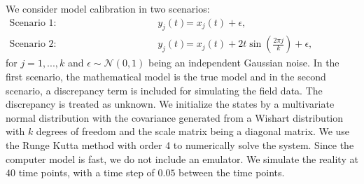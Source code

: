 We consider  model calibration in two scenarios:  
 \begin{align}
 \mbox{Scenario 1: } \quad \quad \quad \quad \quad \quad \quad \quad \quad \quad  y_j(t)&= x_j(t) +\epsilon,    \quad \quad \quad \quad \quad \quad \quad   \quad \quad \quad \quad \quad  \label{equ:no_discrepancy}\\ 
\mbox{Scenario 2: } \quad \quad \quad \quad \quad \quad \quad \quad \quad \quad y_j(t)&= x_j(t) +2t \sin\left(\frac{2\pi j}{k}\right)+ \epsilon,   \quad \quad \quad \quad \quad \quad \quad \quad \quad \quad \quad \quad \label{equ:with_discrepancy}
 \end{align}
 for $j=1,...,k$ and  $\epsilon \sim \mathcal{N}(0, 1)$ being an independent Gaussian noise. In the first scenario, the mathematical model is the true model and in the second scenario, a discrepancy term is included for simulating the field data. The discrepancy is treated as unknown. We initialize the states by a multivariate normal {distribution} with the covariance generated from a Wishart distribution with $k$ degrees of freedom and {the scale matrix being a diagonal matrix}. We use the Runge Kutta method with order 4 to numerically solve the system. Since the computer model is fast,  we do not include an emulator. We simulate the reality at $40$ time points, with a time step of $0.05$ between the time points. 
